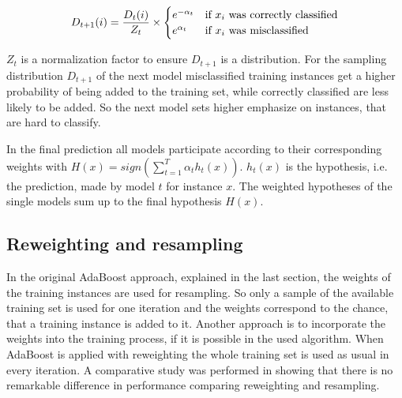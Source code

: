 \documentclass[10pt]{reportMaster}
\begin{document}
\begin{equation}
\label{eq:adaBootsWeightUpdate}
D_{t+1}(i) = \frac{D_t(i)}{Z_t} \times 
\begin{cases}
e^{-\alpha_t} & \text{if $ x_i $ was correctly classified} \\ 
e^{\alpha_t} & \text{if $ x_i $ was misclassified}
\end{cases}
\end{equation}

$Z_t$ is a normalization factor to ensure $D_{t+1}$ is a distribution.
For the sampling distribution $D_{t+1}$ of the next model misclassified training instances get a higher probability of being added to the training set, while correctly classified are less likely to be added.
So the next model sets higher emphasize on instances, that are hard to classify.

In the final prediction all models participate according to their corresponding weights with $H(x) = sign(\sum_{t = 1}^T\alpha_th_t(x))$.
$h_t(x)$ is the hypothesis, i.e. the prediction, made by model $t$ for instance $x$.
The weighted hypotheses of the single models sum up to the final hypothesis $H(x)$. 


\subsection*{Reweighting and resampling}
\label{sec:reweightingResampling}
In the original AdaBoost approach, explained in the last section, the weights of the training instances are used for resampling.
So only a sample of the available training set is used for one iteration and the weights correspond to the chance, that a training instance is added to it.
Another approach is to incorporate the weights into the training process, if it is possible in the used algorithm.
When AdaBoost is applied with reweighting the whole training set is used as usual in every iteration.
A comparative study was performed in \cite{resamplingReweighting} showing that there is no remarkable difference in performance comparing reweighting and resampling.
\end{document}
